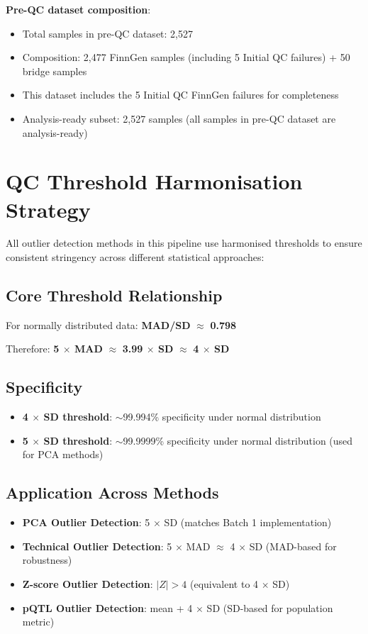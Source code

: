 \documentclass[11pt,a4paper]{article}
\begin{document}
\textbf{Pre-QC dataset composition}:
\begin{itemize}
\item Total samples in pre-QC dataset: 2,527
\item Composition: 2,477 FinnGen samples (including 5 Initial QC failures) + 50 bridge samples
\item This dataset includes the 5 Initial QC FinnGen failures for completeness
\item Analysis-ready subset: 2,527 samples (all samples in pre-QC dataset are analysis-ready)
\end{itemize}

\section{QC Threshold Harmonisation Strategy}

All outlier detection methods in this pipeline use harmonised thresholds to ensure consistent stringency across different statistical approaches:

\subsection{Core Threshold Relationship}
For normally distributed data: \textbf{MAD/SD} $\approx$ \textbf{0.798}

Therefore: \textbf{5 $\times$ MAD} $\approx$ \textbf{3.99 $\times$ SD} $\approx$ \textbf{4 $\times$ SD}

\subsection{Specificity}
\begin{itemize}
\item \textbf{4 $\times$ SD threshold}: $\sim$99.994\% specificity under normal distribution
\item \textbf{5 $\times$ SD threshold}: $\sim$99.9999\% specificity under normal distribution (used for PCA methods)
\end{itemize}

\subsection{Application Across Methods}
\begin{itemize}
\item \textbf{PCA Outlier Detection}: 5 $\times$ SD (matches Batch 1 implementation)
\item \textbf{Technical Outlier Detection}: 5 $\times$ MAD $\approx$ 4 $\times$ SD (MAD-based for robustness)
\item \textbf{Z-score Outlier Detection}: $|Z| > 4$ (equivalent to 4 $\times$ SD)
\item \textbf{pQTL Outlier Detection}: mean + 4 $\times$ SD (SD-based for population metric)
\end{itemize}
\end{document}
